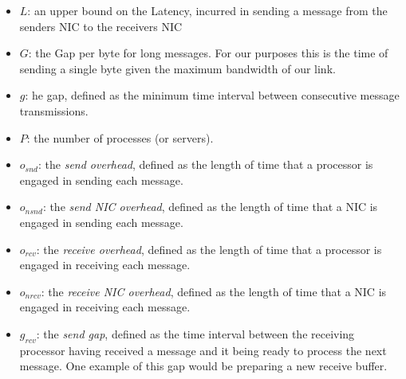 \begin{itemize}
  \item $L$: an upper bound on the Latency, incurred in sending a message from the senders NIC to the receivers NIC
  \item $G$: the Gap per byte for long messages. For our purposes this is the time of sending a single byte given the 
    maximum bandwidth of our link.
  \item $g$: he gap, defined as the minimum time interval between consecutive message transmissions.
  \item $P$: the number of processes (or servers).
  \item $o_{snd}$: the \emph{send overhead}, defined as the length of time that a processor is engaged in sending each message.
  \item $o_{nsnd}$: the \emph{send NIC overhead}, defined as the length of time that a NIC is engaged in sending each message.
  \item $o_{rcv}$: the \emph{receive overhead}, defined as the length of time that a processor is engaged in receiving each message.
  \item $o_{nrcv}$: the \emph{receive NIC overhead}, defined as the length of time that a NIC is engaged in receiving each message.
  \item $g_{rcv}$: the \emph{send gap}, defined as the time interval between the receiving processor having received a message 
    and it being ready to process the next message. One example of this gap would be preparing a new receive buffer.
\end{itemize}

